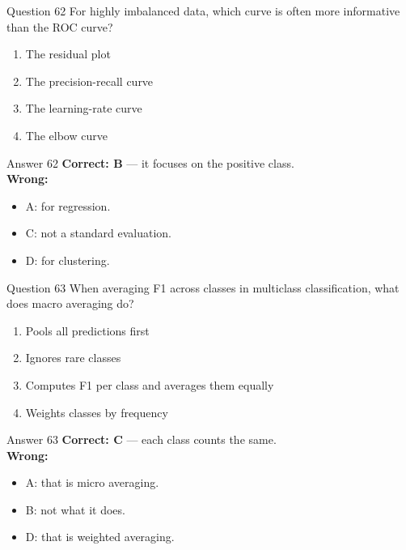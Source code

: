 \documentclass[aspectratio=169,11pt]{beamer}
\begin{document}
\begin{frame}{Question 62}
For highly imbalanced data, which curve is often more informative than the ROC curve?
\begin{enumerate}[label=\Alph*.]
\item The residual plot
\item The precision-recall curve
\item The learning-rate curve
\item The elbow curve
\end{enumerate}
\end{frame}
\begin{frame}{Answer 62}
\textbf{Correct: B} --- it focuses on the positive class.\\
\vspace{0.5em}
\textbf{Wrong:}
\begin{itemize}
\item A: for regression.
\item C: not a standard evaluation.
\item D: for clustering.
\end{itemize}
\end{frame}

\begin{frame}{Question 63}
When averaging F1 across classes in multiclass classification, what does macro averaging do?
\begin{enumerate}[label=\Alph*.]
\item Pools all predictions first
\item Ignores rare classes
\item Computes F1 per class and averages them equally
\item Weights classes by frequency
\end{enumerate}
\end{frame}
\begin{frame}{Answer 63}
\textbf{Correct: C} --- each class counts the same.\\
\vspace{0.5em}
\textbf{Wrong:}
\begin{itemize}
\item A: that is micro averaging.
\item B: not what it does.
\item D: that is weighted averaging.
\end{itemize}
\end{frame}
\end{document}
